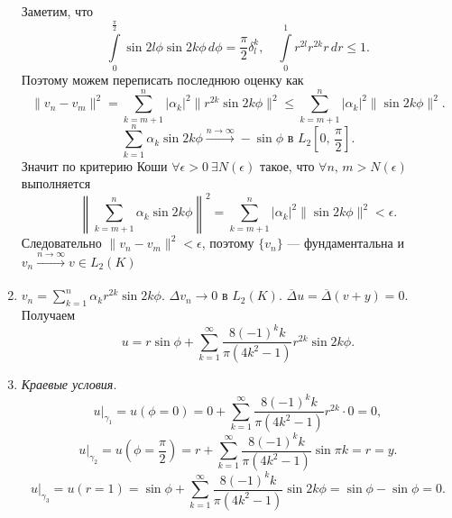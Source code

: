 \documentclass[a4paper]{article}
\begin{document}
\begin{sol}
\begin{enumerate}
Заметим, что
\[
\int\limits_{0}^{\frac{\pi}{2}} \sin 2l\phi \sin 2k\phi\,d\phi= 
\frac{\pi}{2} \delta_l^k,\quad
\int\limits_{0}^{1} r^{2l}r^{2k}r\,dr \le 1 
.\] 
Поэтому можем переписать последнюю оценку как
\[
\| v_n-v_m\|^2=\sum_{k=m+1}^{n} |\alpha_k|^2 \| r^{2k} \sin 2k\phi\|^2\le  \sum_{k=m+1}^{n} |\alpha_k|^2 \| \sin 2k\phi\|^2
.\]
\[
\sum_{k=1}^{n} \alpha_k \sin 2 k \phi \xrightarrow[]{n\to \infty}
-\sin\phi \text{ в }L_2 \left[ 0,\,\frac{\pi}{2} \right] 
.\] 
Значит по критерию Коши $\forall \epsilon>0\ \exists N(\epsilon)$ такое, что $\forall n,\,m>N(\epsilon)$ выполняется
\[
\left\lVert \sum_{k=m+1}^{n} \alpha_k \sin 2k\phi\right\rVert^2=
\sum_{k=m+1}^{n} |\alpha_k|^2 \| \sin 2k\phi\|^2 <\epsilon
.\] 
Следовательно $\| v_n-v_m\|^2 <\epsilon$, поэтому $\{v_n\} $ 
--- фундаментальна и $v_n \xrightarrow[]{n\to \infty}v \in L_2(K)$
\item $\displaystyle v_n=\sum_{k=1}^{n} \alpha_k r^{2k} \sin 2k\phi $. $\Delta v_n\to 0$ в $L_2(K)$. $\overline{\Delta} u=
	\overline{\Delta}(v+y)=0$. Получаем
\[
	u = r \sin \phi + \sum_{k=1}^{\infty} \frac{8(-1)^kk}{\pi
	(4k^2-1)} r^{2k} \sin 2k \phi
.\] 
\item \emph{Краевые условия}.
	\[
		u|_{\gamma_1}= u(\phi=0)=
		0+ \sum_{k=1}^{\infty} \frac{8(-1)^kk}{\pi(4k^2-1)}r^{2k} \cdot 0=0
	,\]
\[
	u|_{\gamma_2}= u\left( \phi= \frac{\pi}{2} \right) =
	r+ \sum_{k=1}^{\infty} \frac{8(-1)^kk}{\pi(4k^2-1)}
	\sin\pi k=r=y
.\] 
\[
	u|_{\gamma_3}= u(r=1)= \sin \phi + \sum_{k=1}^{\infty} \frac{
	8(-1)^kk}{\pi(4k^2-1)}\sin 2k\phi= \sin \phi- \sin \phi=0
.\] 
\end{enumerate}
\end{sol}
\end{document}
